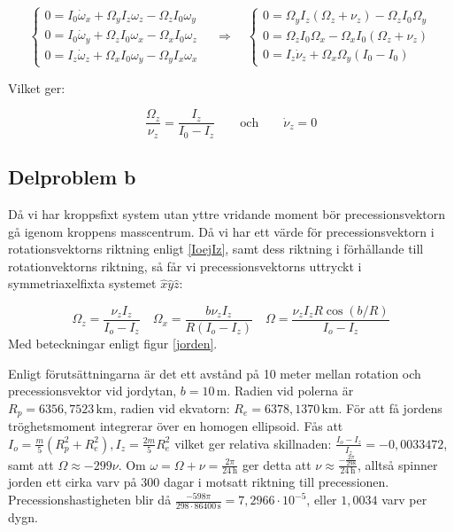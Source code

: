 \documentclass[12pt,a4paper]{article}
\begin{document}
	\begin{equation*}
		\begin{cases}
			0 = I_0 \dot{\omega}_x + \Omega_y I_z \omega_z - \Omega_z I_0 \omega_y\\
			0 = I_0 \dot{\omega}_y + \Omega_z I_0 \omega_x - \Omega_x I_0 \omega_z\\
			0 = I_z \dot{\omega}_z + \Omega_x I_0 \omega_y - \Omega_y I_x \omega_x
		\end{cases}
		\hspace{12pt}
		\Rightarrow
		\hspace{12pt}
		\begin{cases}
			0 = \Omega_y I_z (\Omega_z + \nu_z) - \Omega_z I_0 \Omega_y \\
			0 = \Omega_z I_0 \Omega_x - \Omega_x I_0 (\Omega_z + \nu_z) \\
			0 = I_z \dot{\nu}_z + \Omega_x \Omega_y (I_0 - I_0)
		\end{cases}
	\end{equation*}
	
	Vilket ger:
	
	\begin{equation}
		\frac{\Omega_z}{\nu_z} = \frac{I_z}{I_0 - I_z}
		\hspace{24pt}
		\mathrm{och}
		\hspace{24pt}
		\dot{\nu}_z = 0
\label{IoejIz}
	\end{equation}
	\subsection{Delproblem b}
	Då vi har kroppsfixt system utan yttre vridande moment bör precessionsvektorn
	gå igenom kroppens masscentrum.  Då vi har ett värde för precessionsvektorn i 
        rotationsvektorns riktning enligt \eqref{IoejIz}, samt dess riktning i förhållande 
        till rotationvektorns riktning, så får vi precessionsvektorns uttryckt i 
        symmetriaxelfixta systemet $\hat{x}\hat{y}\hat{z}$:
	
	\begin{equation*}
		\Omega_z = \frac{\nu_z I_z}{I_o-I_z}
		\hspace{12pt}
		\Omega_x = \frac{b \nu_z I_z}{R(I_o-I_z)}
		\hspace{12pt}
		\Omega = \frac{\nu_z I_z R \cos(b/R)}{I_o-I_z}
	\end{equation*}
	Med beteckningar enligt figur \ref{jorden}.

	Enligt förutsättningarna är det ett avstånd på 10 meter mellan rotation och
	precessionsvektor vid jordytan, $b=10 \,\mathrm{m}$. Radien vid polerna är $R_p= 6356,7523 \,\mathrm{km}$,
	radien vid ekvatorn: $R_e=6378,1370 \,\mathrm{km}$. För att få jordens tröghetsmoment integrerar över en homogen ellipsoid.
	Fås att $I_o = \frac{m}{5}(R_p^2+R_e^2), I_z = \frac{2m}{5}R_e^2$ vilket ger relativa
	skillnaden: $\frac{I_o-I_z}{I_z} = -0,0033472$, samt att $\Omega \approx -299\nu$. Om
	$\omega=\Omega+\nu = \frac{2\pi}{24 \,\mathrm{h}}$ ger detta att
	$\nu \approx \frac{-\frac{2\pi}{298}}{24 \,\mathrm{h}}$, alltså spinner jorden ett cirka varv på 300
	dagar i motsatt riktning till precessionen. Precessionshastigheten blir då $\frac{-598\pi}{298 \cdot 86400 \,\mathrm{s}} = 7,2966 \cdot 10^{-5}$, eller $1,0034$ varv per dygn.
\end{document}
